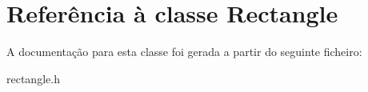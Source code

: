 \hypertarget{class_rectangle}{}\section{Referência à classe Rectangle}
\label{class_rectangle}


A documentação para esta classe foi gerada a partir do seguinte ficheiro\+:\begin{DoxyCompactItemize}
\item 
rectangle.\+h\end{DoxyCompactItemize}
